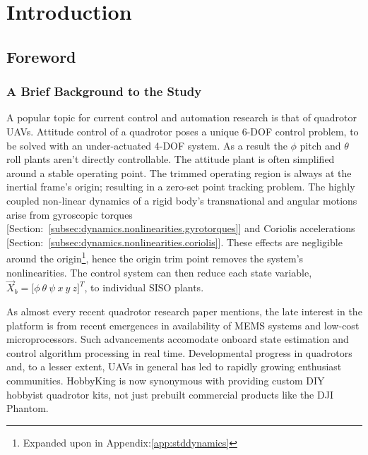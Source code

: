 \chapter{Introduction}
\label{ch:intro}
\section{Foreword}
\label{sec:intro.foreword}
\subsection{A Brief Background to the Study}
\label{subsec:intro.foreword.background}
A popular topic for current control and automation research is that of quadrotor UAVs. Attitude control of a quadrotor poses a unique 6-DOF control problem, to be solved with an under-actuated 4-DOF system. As a result the $\phi$ pitch and $\theta$ roll plants aren't directly controllable. The attitude plant is often simplified around a stable operating point. The trimmed operating region is always at the inertial frame's origin; resulting in a zero-set point tracking problem. The highly coupled non-linear dynamics of a rigid body's transnational and angular motions arise from gyroscopic torques [Section:~\ref{subsec:dynamics.nonlinearities.gyrotorques}] and Coriolis accelerations [Section:~\ref{subsec:dynamics.nonlinearities.coriolis}]. These effects are negligible around the origin\footnote{Expanded upon in Appendix:\ref{app:stddynamics}}, hence the origin trim point removes the system's nonlinearities. The control system can then reduce each state variable, $\vec{X}_b=\big[\phi~\theta~\psi~x~y~z\big]^T$, to individual SISO plants.
\par
As almost every recent quadrotor research paper mentions, the late interest in the platform is from recent emergences in availability of MEMS systems and low-cost microprocessors. Such advancements accomodate onboard state estimation and control algorithm processing in real time. Developmental progress in quadrotors and, to a lesser extent, UAVs in general has led to rapidly growing enthusiast communities. HobbyKing\cite{hobbyking} is now synonymous with providing custom DIY hobbyist quadrotor kits, not just prebuilt commercial products like the DJI Phantom\cite{phantom}.
